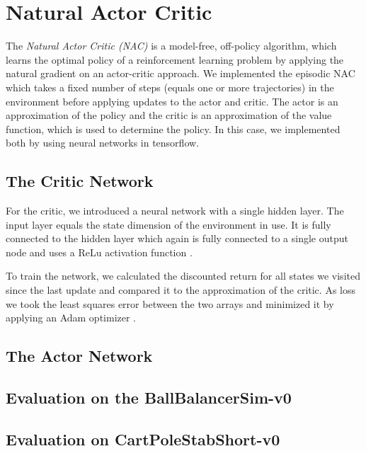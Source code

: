 
\section{Natural Actor Critic}
\label{sec:nac}

The \textit{Natural Actor Critic (NAC)} \citep{peters2008natural} is a model-free, off-policy algorithm, which learns the optimal policy of a reinforcement learning problem by applying the natural gradient \citep{amari1998natural} on an actor-critic \citep{sutton1998introduction} approach. We implemented the episodic NAC \citep{peters2008natural} which takes a fixed number of steps (equals one or more trajectories) in the environment before applying updates to the actor and critic. The actor is an approximation of the policy and the critic is an approximation of the value function, which is used to determine the policy. In this case, we implemented both by using neural networks in tensorflow.

\subsection{The Critic Network}
For the critic, we introduced a neural network with a single hidden layer. The input layer equals the state dimension of the environment in use. It is fully connected to the hidden layer which again is fully connected to a single output node and uses a ReLu activation function \citep{glorot2011deep}. 

To train the network, we calculated the discounted return for all states we visited since the last update and compared it to the approximation of the critic. As loss we took the least squares error between the two arrays and minimized it by applying an Adam optimizer \citep{kingma2014adam}.

\subsection{The Actor Network}

\subsection{Evaluation on the BallBalancerSim-v0}
\subsection{Evaluation on CartPoleStabShort-v0}

